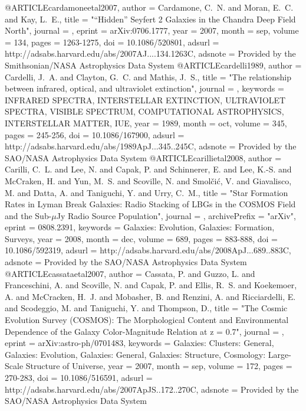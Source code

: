 {{{{{{{{{{{{{@ARTICLE{cardamoneetal2007,
   author = {{Cardamone}, C.~N. and {Moran}, E.~C. and {Kay}, L.~E.},
    title = "{``Hidden'' Seyfert 2 Galaxies in the Chandra Deep Field North}",
  journal = {\aj},
   eprint = {arXiv:0706.1777},
     year = 2007,
    month = sep,
   volume = 134,
    pages = {1263-1275},
      doi = {10.1086/520801},
   adsurl = {http://adsabs.harvard.edu/abs/2007AJ....134.1263C},
  adsnote = {Provided by the Smithsonian/NASA Astrophysics Data System}
}
@ARTICLE{cardelli1989,
   author = {{Cardelli}, J.~A. and {Clayton}, G.~C. and {Mathis}, J.~S.},
    title = "{The relationship between infrared, optical, and ultraviolet extinction}",
  journal = {\apj},
 keywords = {INFRARED SPECTRA, INTERSTELLAR EXTINCTION, ULTRAVIOLET SPECTRA, VISIBLE SPECTRUM, COMPUTATIONAL ASTROPHYSICS, INTERSTELLAR MATTER, IUE},
     year = 1989,
    month = oct,
   volume = 345,
    pages = {245-256},
      doi = {10.1086/167900},
   adsurl = {http://adsabs.harvard.edu/abs/1989ApJ...345..245C},
  adsnote = {Provided by the SAO/NASA Astrophysics Data System}
}
@ARTICLE{carillietal2008,
   author = {{Carilli}, C.~L. and {Lee}, N. and {Capak}, P. and {Schinnerer}, E. and 
	{Lee}, K.-S. and {McCraken}, H. and {Yun}, M.~S. and {Scoville}, N. and 
	{Smol{\v c}i{\'c}}, V. and {Giavalisco}, M. and {Datta}, A. and 
	{Taniguchi}, Y. and {Urry}, C.~M.},
    title = "{Star Formation Rates in Lyman Break Galaxies: Radio Stacking of LBGs in the COSMOS Field and the Sub-{$\mu$}Jy Radio Source Population}",
  journal = {\apj},
archivePrefix = "arXiv",
   eprint = {0808.2391},
 keywords = {Galaxies: Evolution, Galaxies: Formation, Surveys},
     year = 2008,
    month = dec,
   volume = 689,
    pages = {883-888},
      doi = {10.1086/592319},
   adsurl = {http://adsabs.harvard.edu/abs/2008ApJ...689..883C},
  adsnote = {Provided by the SAO/NASA Astrophysics Data System}
}
@ARTICLE{cassataetal2007,
   author = {{Cassata}, P. and {Guzzo}, L. and {Franceschini}, A. and {Scoville}, N. and 
	{Capak}, P. and {Ellis}, R.~S. and {Koekemoer}, A. and {McCracken}, H.~J. and 
	{Mobasher}, B. and {Renzini}, A. and {Ricciardelli}, E. and 
	{Scodeggio}, M. and {Taniguchi}, Y. and {Thompson}, D.},
    title = "{The Cosmic Evolution Survey (COSMOS): The Morphological Content and Environmental Dependence of the Galaxy Color-Magnitude Relation at z = 0.7}",
  journal = {\apjs},
   eprint = {arXiv:astro-ph/0701483},
 keywords = {Galaxies: Clusters: General, Galaxies: Evolution, Galaxies: General, Galaxies: Structure, Cosmology: Large-Scale Structure of Universe},
     year = 2007,
    month = sep,
   volume = 172,
    pages = {270-283},
      doi = {10.1086/516591},
   adsurl = {http://adsabs.harvard.edu/abs/2007ApJS..172..270C},
  adsnote = {Provided by the SAO/NASA Astrophysics Data System}
}

}}}}}}}}}}}}}
